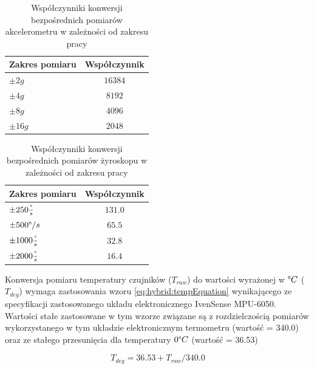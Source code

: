 

\begin{table}[!htp]
	\centering
	\caption{Współczynniki konwersji bezpośrednich pomiarów akcelerometru w zależności od zakresu pracy}
	\label{tab:hybrid:accRangeFactors} 
	\begin{tabular}{|l|c|}
		\hline
		Zakres pomiaru              & Współczynnik \\ \hline
		$\pm2g$                     & $16384$        \\ \hline
		\rowcolor{black!20} $\pm4g$ & $8192$         \\ \hline
		$\pm8g$                     & $4096$         \\ \hline
		$\pm16g$                    & $2048$         \\ \hline
	\end{tabular}
\end{table}
\begin{table}[!htp]
	\centering
	\caption{Współczynniki konwersji bezpośrednich pomiarów żyroskopu w zależności od zakresu pracy}	
	\label{tab:hybrid:gyroRangeFactors}	
	\begin{tabular}{|l|c|}
		\hline
		Zakres pomiaru                        & Współczynnik \\ \hline
		$\pm250\frac{\degree}{s}$             & $131.0$        \\ \hline
		\rowcolor{black!20} $\pm500\degree/s$ & $65.5$         \\ \hline
		$\pm1000\frac{\degree}{s}$            & $32.8$         \\ \hline
		$\pm2000\frac{\degree}{s}$            & $16.4$         \\ \hline
	\end{tabular}
\end{table} 		
 

Konwersja pomiaru temperatury czujników ($T_{raw}$) do wartości wyrażonej w $\degree C$ ($T_{deg}$) wymaga zastosowania wzoru \eqref{eq:hybrid:tempEquation} wynikającego ze specyfikacji zastosowanego układu elektronicznego IvenSense MPU-6050. Wartości stałe zastosowane w tym wzorze związane są z rozdzielczością pomiarów wykorzystanego w tym układzie elektronicznym termometru (wartość = 340.0) oraz ze stałego przesunięcia dla temperatury $0 \degree C$ (wartość = 36.53)

\begin{equation}
	T_{deg} = 36.53 + T_{raw} / 340.0
	\label{eq:hybrid:tempEquation}
\end{equation}

